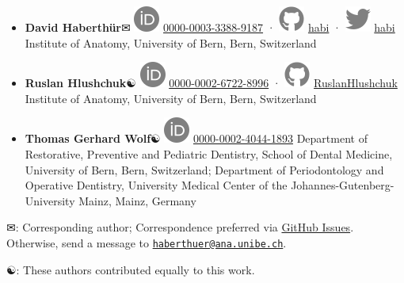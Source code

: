 \documentclass[
  american,
]{article}
\begin{document}
\begin{itemize}
\item
  \textbf{David Haberthür}✉
  \includegraphics{images/orcid.svg}
  \href{https://orcid.org/0000-0003-3388-9187}{0000-0003-3388-9187}
  · \includegraphics{images/github.svg}
  \href{https://github.com/habi}{habi}
  · \includegraphics{images/twitter.svg}
  \href{https://twitter.com/habi}{habi}
  Institute of Anatomy, University of Bern, Bern, Switzerland
\item
  \textbf{Ruslan Hlushchuk}☯
  \includegraphics{images/orcid.svg}
  \href{https://orcid.org/0000-0002-6722-8996}{0000-0002-6722-8996}
  · \includegraphics{images/github.svg}
  \href{https://github.com/RuslanHlushchuk}{RuslanHlushchuk}
  Institute of Anatomy, University of Bern, Bern, Switzerland
\item
  \textbf{Thomas Gerhard Wolf}☯
  \includegraphics{images/orcid.svg}
  \href{https://orcid.org/0000-0002-4044-1893}{0000-0002-4044-1893}
  Department of Restorative, Preventive and Pediatric Dentistry, School of Dental Medicine, University of Bern, Bern, Switzerland; Department of Periodontology and Operative Dentistry, University Medical Center of the Johannes-Gutenberg-University Mainz, Mainz, Germany
\end{itemize}

✉: Corresponding author; Correspondence preferred via \href{https://github.com/habi/zmk-tooth-cohort-method-manuscript/issues}{GitHub Issues}. Otherwise, send a message to \href{mailto:haberthuer@ana.unibe.ch}{\nolinkurl{haberthuer@ana.unibe.ch}}.

☯: These authors contributed equally to this work.
\end{document}
